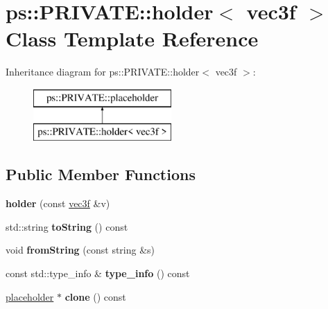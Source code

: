 \hypertarget{classps_1_1PRIVATE_1_1holder_3_01vec3f_01_4}{}\section{ps\+:\+:P\+R\+I\+V\+A\+T\+E\+:\+:holder$<$ vec3f $>$ Class Template Reference}
\label{classps_1_1PRIVATE_1_1holder_3_01vec3f_01_4}
Inheritance diagram for ps\+:\+:P\+R\+I\+V\+A\+T\+E\+:\+:holder$<$ vec3f $>$\+:\begin{figure}[H]
\begin{center}
\leavevmode
\includegraphics[height=2.000000cm]{classps_1_1PRIVATE_1_1holder_3_01vec3f_01_4}
\end{center}
\end{figure}
\subsection*{Public Member Functions}
\begin{DoxyCompactItemize}
\item 
\hypertarget{classps_1_1PRIVATE_1_1holder_3_01vec3f_01_4_acffc22ac5f431948ae1e8bf629a6bb3f}{}{\bfseries holder} (const \hyperlink{classps_1_1base_1_1Vec3}{vec3f} \&v)\label{classps_1_1PRIVATE_1_1holder_3_01vec3f_01_4_acffc22ac5f431948ae1e8bf629a6bb3f}

\item 
\hypertarget{classps_1_1PRIVATE_1_1holder_3_01vec3f_01_4_a5ce11e3198303498c46ca6974b935434}{}std\+::string {\bfseries to\+String} () const \label{classps_1_1PRIVATE_1_1holder_3_01vec3f_01_4_a5ce11e3198303498c46ca6974b935434}

\item 
\hypertarget{classps_1_1PRIVATE_1_1holder_3_01vec3f_01_4_a567e3ed7dff33e829ef2b306d8f44eb7}{}void {\bfseries from\+String} (const string \&s)\label{classps_1_1PRIVATE_1_1holder_3_01vec3f_01_4_a567e3ed7dff33e829ef2b306d8f44eb7}

\item 
\hypertarget{classps_1_1PRIVATE_1_1holder_3_01vec3f_01_4_a7f3948aacc1eb0faa52936545f38107b}{}const std\+::type\+\_\+info \& {\bfseries type\+\_\+info} () const \label{classps_1_1PRIVATE_1_1holder_3_01vec3f_01_4_a7f3948aacc1eb0faa52936545f38107b}

\item 
\hypertarget{classps_1_1PRIVATE_1_1holder_3_01vec3f_01_4_aa80087c995c80c03ef9e3d61c1f0cd6b}{}\hyperlink{classps_1_1PRIVATE_1_1placeholder}{placeholder} $\ast$ {\bfseries clone} () const \label{classps_1_1PRIVATE_1_1holder_3_01vec3f_01_4_aa80087c995c80c03ef9e3d61c1f0cd6b}

\end{DoxyCompactItemize}
